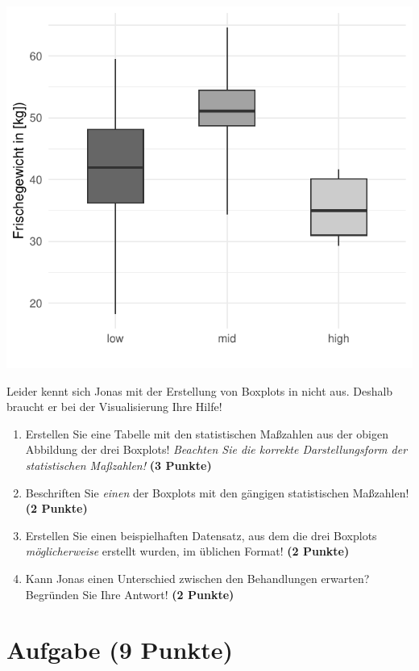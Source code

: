 \documentclass[a4paper, 9pt]{scrartcl}\usepackage[]{graphicx}\usepackage[]{xcolor}
\makeatletter
\def\maxwidth{ %
  \ifdim\Gin@nat@width>\linewidth
    \linewidth
  \else
    \Gin@nat@width
  \fi
}
\makeatother
\begin{document}
{\centering \includegraphics[width=\maxwidth]{img/boxplot-02-zer-1} 

}




Leider kennt sich Jonas mit der Erstellung von Boxplots in \Rlogo nicht aus. Deshalb braucht er bei der Visualisierung Ihre Hilfe!

\begin{enumerate}
\item Erstellen Sie eine Tabelle mit den statistischen Maßzahlen aus der obigen Abbildung der drei Boxplots! \textit{Beachten Sie die korrekte Darstellungsform der statistischen Maßzahlen!} \textbf{(3 Punkte)}
\item Beschriften Sie \textit{einen} der Boxplots mit den gängigen statistischen Maßzahlen! \textbf{(2 Punkte)}
\item Erstellen Sie einen beispielhaften Datensatz, aus dem die drei Boxplots \textit{möglicherweise} erstellt wurden, im \Rlogo üblichen Format! \textbf{(2 Punkte)}
\item Kann Jonas einen Unterschied zwischen den Behandlungen erwarten? Begründen Sie Ihre Antwort! \textbf{(2 Punkte)}
\end{enumerate} 
\clearpage

\section{Aufgabe \hfill (9 Punkte)}
\end{document}
